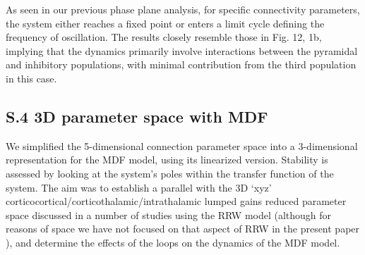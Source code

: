 \documentclass[12pt,twoside]{article}
\begin{document}
As seen in our previous phase plane analysis, for specific connectivity parameters, the system either reaches a fixed point or enters a limit cycle defining the frequency of oscillation. The results closely resemble those in Fig. 12, 1b, implying that the dynamics primarily involve interactions between the pyramidal and inhibitory populations, with minimal contribution from the third population in this case.

\newpage
\subsection*{S.4 3D parameter space with MDF}

We simplified the 5-dimensional connection parameter space into a 3-dimensional representation for the MDF model, using its linearized version. Stability is assessed by looking at the system's poles within the transfer function of the system.
The aim was to establish a parallel with the 3D `xyz' corticocortical/corticothalamic/intrathalamic lumped gains reduced parameter space discussed in a number of studies using the RRW model (although for reasons of space we have not focused on that aspect of RRW in the present paper \citealp{robinson2002dynamics,robinson2005multiscale, roberts2012corticothalamic, breakspear2006unifying, abeysuriya2015physiologically}), and determine the effects of the loops on the dynamics of the MDF model.
\end{document}
